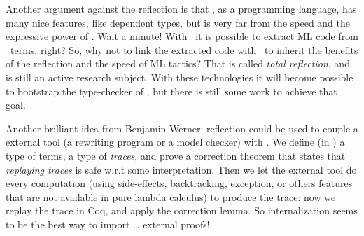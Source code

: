 Another argument against the reflection is that \Coq, as a
programming language, has many nice features, like dependent types, 
but is very far from the
speed and the expressive power of \ocaml. Wait a minute! With \Coq\
it is possible to extract ML code from \CIC\ terms, right? So, why not
to link the extracted code with \Coq\ to inherit the benefits of the
reflection and the speed of ML tactics? That is called \textit{total
  reflection}, and is still an active research subject. With these
technologies it will become possible to bootstrap the type-checker of
\CIC, but there is still some work to achieve that goal.

Another brilliant idea from Benjamin Werner: reflection could be used
to couple a external tool (a rewriting program or a model checker)
with \Coq. We define (in \Coq) a type of terms, a type of
\emph{traces}, and prove a correction theorem that states that
\emph{replaying traces} is safe w.r.t some interpretation. Then we let 
the external tool do every computation (using side-effects,
backtracking, exception, or others features that are not available in
pure lambda calculus) to produce the trace: now we replay the trace in
Coq{}, and apply the correction lemma. So internalization seems to be
the best way to import \dots{} external proofs!

 
